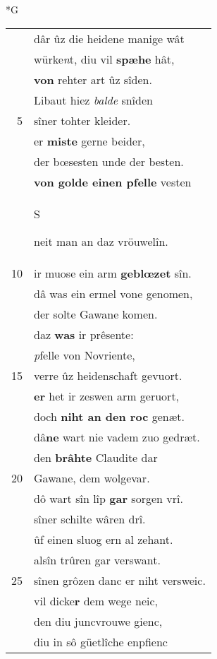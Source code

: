 \documentclass[8pt,a4paper,notitlepage]{article}
\begin{document}
\begin{table}[ht]
\begin{minipage}[t]{0.5\linewidth}
\small
\begin{center}*G
\end{center}
\begin{tabular}{rl}
 & dâr ûz die heidene manige wât\\ 
 & würke\textit{n}t, diu vil \textbf{spæhe} hât,\\ 
 & \textbf{von} rehter art ûz sîden.\\ 
 & Libaut hiez \textit{balde} snîden\\ 
5 & sîner tohter kleider.\\ 
 & er \textbf{miste} gerne beider,\\ 
 & der bœsesten unde der besten.\\ 
 & \textbf{von golde einen pfelle} vesten\\ 
 & \begin{large}S\end{large}neit man an daz vröuwelîn.\\ 
10 & ir muose ein arm \textbf{geblœzet} sîn.\\ 
 & dâ was ein ermel vone genomen,\\ 
 & der solte Gawane komen.\\ 
 & daz \textbf{was} ir prêsente:\\ 
 & \textit{p}felle von Novriente,\\ 
15 & verre ûz heidenschaft gevuort.\\ 
 & \textbf{er} het ir zeswen arm geruort,\\ 
 & doch \textbf{niht an den roc} genæt.\\ 
 & dâ\textbf{ne} wart nie vadem zuo gedræt.\\ 
 & den \textbf{brâhte} Claudite dar\\ 
20 & Gawane, dem wolgevar.\\ 
 & dô wart sîn lîp \textbf{gar} sorgen vrî.\\ 
 & sîner schilte wâren drî.\\ 
 & ûf einen sluog ern al zehant.\\ 
 & alsîn trûren gar verswant.\\ 
25 & sînen grôzen danc er niht versweic.\\ 
 & vil dicke\textbf{r} dem wege neic,\\ 
 & den diu juncvrouwe gienc,\\ 
 & diu in sô güetlîche enpfienc\\ 

\end{tabular}
\end{minipage}
\end{table}
\end{document}
